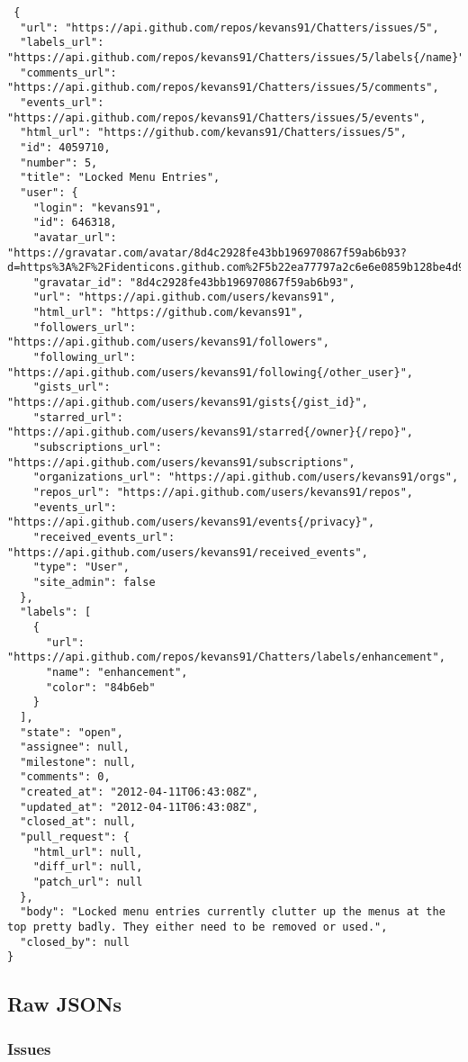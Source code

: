 \documentclass[a4paper,10pt]{article}
\begin{document}
\begin{lstlisting}
 {
  "url": "https://api.github.com/repos/kevans91/Chatters/issues/5",
  "labels_url": "https://api.github.com/repos/kevans91/Chatters/issues/5/labels{/name}",
  "comments_url": "https://api.github.com/repos/kevans91/Chatters/issues/5/comments",
  "events_url": "https://api.github.com/repos/kevans91/Chatters/issues/5/events",
  "html_url": "https://github.com/kevans91/Chatters/issues/5",
  "id": 4059710,
  "number": 5,
  "title": "Locked Menu Entries",
  "user": {
    "login": "kevans91",
    "id": 646318,
    "avatar_url": "https://gravatar.com/avatar/8d4c2928fe43bb196970867f59ab6b93?d=https%3A%2F%2Fidenticons.github.com%2F5b22ea77797a2c6e6e0859b128be4d94.png&r=x",
    "gravatar_id": "8d4c2928fe43bb196970867f59ab6b93",
    "url": "https://api.github.com/users/kevans91",
    "html_url": "https://github.com/kevans91",
    "followers_url": "https://api.github.com/users/kevans91/followers",
    "following_url": "https://api.github.com/users/kevans91/following{/other_user}",
    "gists_url": "https://api.github.com/users/kevans91/gists{/gist_id}",
    "starred_url": "https://api.github.com/users/kevans91/starred{/owner}{/repo}",
    "subscriptions_url": "https://api.github.com/users/kevans91/subscriptions",
    "organizations_url": "https://api.github.com/users/kevans91/orgs",
    "repos_url": "https://api.github.com/users/kevans91/repos",
    "events_url": "https://api.github.com/users/kevans91/events{/privacy}",
    "received_events_url": "https://api.github.com/users/kevans91/received_events",
    "type": "User",
    "site_admin": false
  },
  "labels": [
    {
      "url": "https://api.github.com/repos/kevans91/Chatters/labels/enhancement",
      "name": "enhancement",
      "color": "84b6eb"
    }
  ],
  "state": "open",
  "assignee": null,
  "milestone": null,
  "comments": 0,
  "created_at": "2012-04-11T06:43:08Z",
  "updated_at": "2012-04-11T06:43:08Z",
  "closed_at": null,
  "pull_request": {
    "html_url": null,
    "diff_url": null,
    "patch_url": null
  },
  "body": "Locked menu entries currently clutter up the menus at the top pretty badly. They either need to be removed or used.",
  "closed_by": null
}
\end{lstlisting}

\subsection{Raw JSONs}
\subsubsection{Issues}
\end{document}

